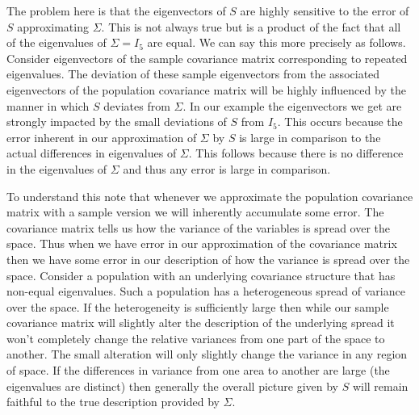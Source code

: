 \documentclass{book}
\begin{document}
The problem here is that the eigenvectors of $S$ are highly sensitive to the error of $S$ approximating $\Sigma$. This is not always true but is a product of the fact that all of the eigenvalues of $\Sigma=I_5$ are equal. We can say this more precisely as follows. Consider eigenvectors of the sample covariance matrix corresponding to repeated eigenvalues. The deviation of these sample eigenvectors from the associated eigenvectors of the population covariance matrix will be highly influenced by the manner in which $S$ deviates from $\Sigma$. In our example the eigenvectors we get are strongly impacted by the small deviations of $S$ from $I_5$. This occurs because the error inherent in our approximation of $\Sigma$ by $S$ is large in comparison to the actual differences in eigenvalues of $\Sigma$. This follows because there is no difference in the eigenvalues of $\Sigma$ and thus any error is large in comparison. 

To understand this note that whenever we approximate the population covariance matrix with a sample version we will inherently accumulate some error. The covariance matrix tells us how the variance of the variables is spread over the space. Thus when we have error in our approximation of the covariance matrix then we have some error in our description of how the variance is spread over the space. Consider a population with an underlying covariance structure that has non-equal eigenvalues. Such a population has a heterogeneous spread of variance over the space. If the heterogeneity is sufficiently large then while our sample covariance matrix will slightly alter the description of the underlying spread it won't completely change the relative variances from one part of the space to another. The small alteration will only slightly change the variance in any region of space. If the differences in variance from one area to another are large (the eigenvalues are distinct) then generally the overall picture given by $S$ will remain faithful to the true description provided by $\Sigma$. 
\end{document}
